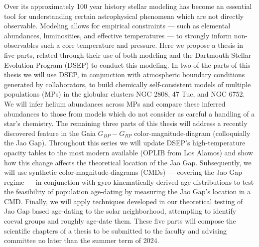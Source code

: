 Over its approximately 100 year history stellar modeling has become an
essential tool for understanding certain astrophysical phenomena which are not
directly observable. Modeling allows for empirical constraints --- such as
elemental abundances, luminosities, and effective temperatures --- to strongly
inform non-observables such a core temperature and pressure. Here we propose a
thesis in five parts, related through their use of both modeling and the
Dartmouth Stellar Evolution Program (DSEP) to conduct this modeling. In two of
the parts of this thesis we will use DSEP, in conjunction with atmospheric
boundary conditions generated by collaborators, to build chemically
self-consistent models of multiple populations (MPs) in the globular clusters
NGC 2808, 47 Tuc, and NGC 6752. We will infer helium abundances across MPs and
compare these inferred abundances to those from models which do not consider as
careful a handling of a star's chemistry. The remaining three parts of this
thesis will address a recently discovered feature in the Gaia $G_{BP} - G_{RP}$
color-magnitude-diagram (colloquially the Jao Gap). Throughout this series we
will update DSEP's high-temperature opacity tables to the most modern available
(OPLIB from Los Alamos) and show how this change affects the theoretical
location of the Jao Gap. Subsequently, we will use synthetic
color-magnitude-diagrams (CMDs) --- covering the Jao Gap regime --- in
conjunction with gyro-kinematically derived age distributions to test the
feasibility of population age-dating by measuring the Jao Gap's location in a
CMD. Finally, we will apply techniques developed in our theoretical testing of
Jao Gap based age-dating to the solar neighborhood, attempting to identify
coeval groups and roughly age-date them. These five parts will compose the
scientific chapters of a thesis to be submitted to the faculty and advising
committee no later than the summer term of 2024.
